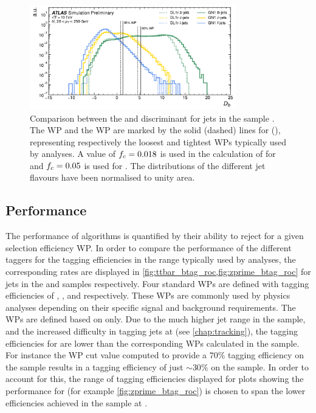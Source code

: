 \begin{figure}[!htb]
    \centering
    \includegraphics[width=0.8\textwidth]{chapters/gnn_tagger/figs/results/main/ttbar/ttbar_score_DL1r_GN120220509_btag.pdf}
    \caption{Comparison between the \DLr and \GNN \btag discriminant \Db for jets in the \ttbar sample \cite{ATL-PHYS-PUB-2022-027}.
    The  WP and the  WP are marked by the solid (dashed) lines for \GNN (\DLr), representing respectively the loosest and tightest WPs typically used by analyses.
    A value of $f_c = 0.018$ is used in the calculation of \Db for \DLr and $f_c = 0.05$ is used for \GNN. The distributions of the different jet flavours have been normalised to unity area.}
    \label{fig:ttbar_btag_disc}
\end{figure}



\subsection{\texorpdfstring{\btagging}{b-tagging} Performance}\label{sec:gnn_btag_perf}

The performance of \btag algorithms is quantified by their ability to reject \cljets for a given \bjet selection efficiency WP.
In order to compare the \btag performance of the different taggers for the \bjet tagging efficiencies in the range typically used by analyses, the corresponding \clrej rates are displayed in \cref{fig:ttbar_btag_roc,fig:zprime_btag_roc} for jets in the \ttbar and \Zprime samples respectively.
Four standard WPs are defined with \bjet tagging efficiencies of , ,  and  respectively.
These WPs are commonly used by physics analyses depending on their specific signal and background requirements.
The WPs are defined based on \ttbarjets only.
Due to the much higher jet \pt range in the \Zprime sample, and the increased difficulty in tagging jets at \highpt (see \cref{chap:tracking}), the \bjet tagging efficiencies for \Zprimejets are lower than the corresponding WPs calculated in the \ttbar sample.
For instance the WP cut value computed to provide a $70\%$ \bjet tagging efficiency on the \ttbar sample results in a \bjet tagging efficiency of just $\sim30\%$ on the \Zprime sample.
In order to account for this, the range of \bjet tagging efficiencies displayed for plots showing the performance for \Zprimejets (for example \cref{fig:zprime_btag_roc}) is chosen to span the lower efficiencies achieved in the \Zprime sample at \highpt.

